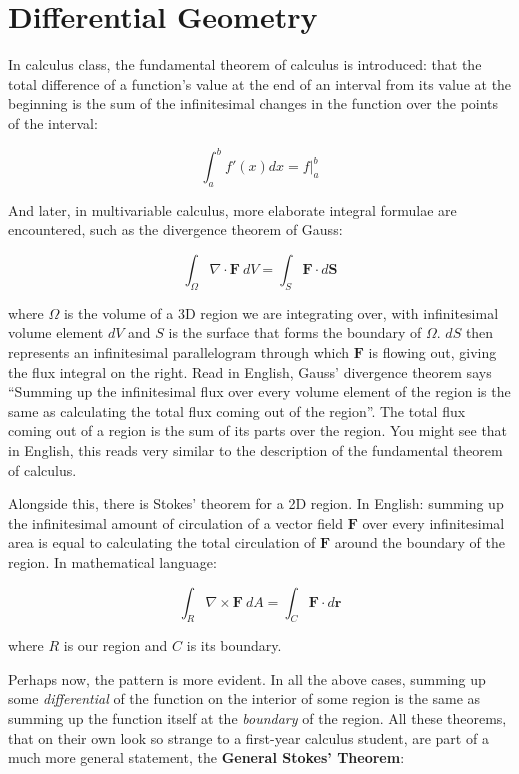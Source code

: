 
\chapter{Differential Geometry}

In calculus class, the fundamental theorem of calculus is introduced: that the total difference of a function's value at the end of an interval from its value at the beginning is the sum of the infinitesimal changes in the function over the points of the interval:

	\begin{equation}\label{eq:FTOC}
		\int_a^b f'(x) dx = f\Big\rvert^b_a
	\end{equation}

And later, in multivariable calculus, more elaborate integral formulae are encountered, such as the divergence theorem of Gauss:

	\begin{equation}\label{eq:Divergence}
		\int_\Omega \nabla \cdot \mathbf{F} ~ dV = \int_S \mathbf{F} \cdot d\mathbf S
	\end{equation}

	where $\Omega$ is the volume of a 3D region we are integrating over, with infinitesimal volume element $dV$ and $S$ is the surface that forms the boundary of $\Omega$. $dS$ then represents an infinitesimal parallelogram through which $\mathbf{F}$ is flowing out, giving the flux integral on the right. Read in English, Gauss' divergence theorem says ``Summing up the infinitesimal flux over every volume element of the region is the same as calculating the total flux coming out of the region''. The total flux coming out of a region is the sum of its parts over the region. You might see that in English, this reads very similar to the description of the fundamental theorem of calculus.
	
	Alongside this, there is Stokes' theorem for a 2D region. In English: summing up the infinitesimal amount of circulation of a vector field $\mathbf F$ over every infinitesimal area is equal to calculating the total circulation of $\mathbf F$ around the boundary of the region. In mathematical language:
	
	\begin{equation}\label{eq:Stokes}
		\int_R \nabla \times \mathbf{F} ~ dA = \int_C \mathbf{F} \cdot d\mathbf r
	\end{equation}
	
	where $R$ is our region and $C$ is its boundary.
	
	Perhaps now, the pattern is more evident. In all the above cases, summing up some \emph{differential} of the function on the interior of some region is the same as summing up the function itself at the \emph{boundary} of the region. All these theorems, that on their own look so strange to a first-year calculus student, are part of a much more general statement, the \textbf{General Stokes' Theorem}:
	
